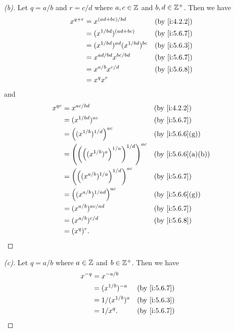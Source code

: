 \begin{proof}[(b)]
  Let \(q = a / b\) and \(r = c / d\) where \(a, c \in \mathbb{Z}\) and \(b, d \in \mathbb{Z}^+\).
  Then we have
  \begin{align*}
    x^{q + r} & = x^{(ad + bc) / bd}                  &  & \by{i:4.2.2}                \\
              & = (x^{1 / bd})^{(ad + bc)}            &  & \by{i:5.6.7}                \\
              & = (x^{1 / bd})^{ad} (x^{1 / bd})^{bc} &  & \by{i:5.6.3}                \\
              & = x^{ad / bd} x^{bc / bd}             &  & \text{(by  \cref{i:5.6.7})} \\
              & = x^{a / b} x^{c / d}                 &  & \by{i:5.6.8}                \\
              & = x^q x^r
  \end{align*}
  and
  \begin{align*}
    x^{qr} & = x^{ac / bd}                                       &  & \by{i:4.2.2}      \\
           & = (x^{1 / bd})^{ac}                                 &  & \by{i:5.6.7}      \\
           & = \pa{(x^{1 / b})^{1 / d}}^{ac}                     &  & \by{i:5.6.6}[g]   \\
           & = \pa{\pa{\pa{(x^{1 / b})^a}^{1 / a}}^{1 / d}}^{ac} &  & \by{i:5.6.6}[a,b] \\
           & = \pa{\pa{(x^{a / b})^{1 / a}}^{1 / d}}^{ac}        &  & \by{i:5.6.7}      \\
           & = \pa{(x^{a / b})^{1 / ad}}^{ac}                    &  & \by{i:5.6.6}[g]   \\
           & = (x^{a / b})^{ac / ad}                             &  & \by{i:5.6.7}      \\
           & = (x^{a / b})^{c / d}                               &  & \by{i:5.6.8}      \\
           & = (x^q)^r.
  \end{align*}
\end{proof}

\begin{proof}[(c)]
  Let \(q = a / b\) where \(a \in \mathbb{Z}\) and \(b \in \mathbb{Z}^+\).
  Then we have
  \begin{align*}
    x^{-q} & = x^{-a / b}                          \\
           & = (x^{1 / b})^{-a}  &  & \by{i:5.6.7} \\
           & = 1 / (x^{1 / b})^a &  & \by{i:5.6.3} \\
           & = 1 / x^q.          &  & \by{i:5.6.7}
  \end{align*}
\end{proof}

